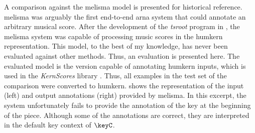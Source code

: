 
A comparison against the \gls{melisma} model is presented
for historical reference. \gls{melisma} was arguably the
first end-to-end \gls{arna} system that could annotate an
arbitrary musical score. After the development of the
\emph{tsroot} program in \textcite{sapp2009tsroot}, the
\gls{melisma} system was capable of processing music scores
in the \gls{humkern} representation. This model, to the best
of my knowledge, has never been evaluated against other
methods. Thus, an evaluation is presented here. The
evaluated model is the version capable of annotating
\gls{humkern} inputs, which is used in the \emph{KernScores}
library \parencite{sapp2005online}. Thus, all examples in
the test set of the comparison were converted to
\gls{humkern}.  shows the
representation of the input (left) and output annotations
(right) provided by \gls{melisma}. In this excerpt, the
system unfortunately fails to provide the annotation of the
key at the beginning of the piece. Although some of the
annotations are correct, they are interpreted in the default
key context of $\keyC$.



